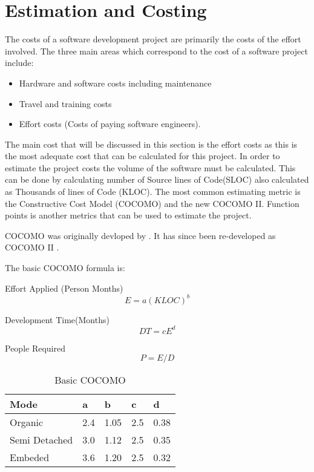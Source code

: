 \section{Estimation and Costing} 
\label{sec:estimation_and_costing}

The costs of a software development project are primarily the costs of the effort involved. The three main areas which correspond to the cost of a software project include:

\begin{itemize}
	\item Hardware and software costs including maintenance
	\item Travel and training costs
	\item Effort costs (Costs of paying software engineers).
\end{itemize}

The main cost that will be discussed in this section is the effort costs as this is the most adequate cost that can be calculated for this project. In order to estimate the project costs the volume of the software must be calculated. This can be done by calculating number of Source lines of Code(SLOC) also calculated as Thousands of lines of Code (KLOC). The most common estimating metric is the Constructive Cost Model (COCOMO) and the new COCOMO II. Function points is another metrics that can be used to estimate the project. 

COCOMO was originally devloped by \citet{see81}. It has since been re-developed as COCOMO II \citep{cocomo2}. 

The basic COCOMO formula is:

Effort Applied (Person Months)
\[
	E=a(KLOC)^{b}
\]

Development Time(Months)
\[
	DT=cE^{d}
\]

People Required
\[
	P=E/D
\]

\begin{table}[H]
  	\centering
  	\small
    \begin{tabular}{|l|l|l|l|l|}
    \hline
    Mode          & a   & b    & c   & d    \\ \hline
    Organic       & 2.4 & 1.05 & 2.5 & 0.38 \\ \hline
    Semi Detached & 3.0 & 1.12 & 2.5 & 0.35 \\ \hline
    Embeded       & 3.6 & 1.20 & 2.5 & 0.32 \\ \hline
    \end{tabular}
    \caption {Basic COCOMO}
\end{table}

